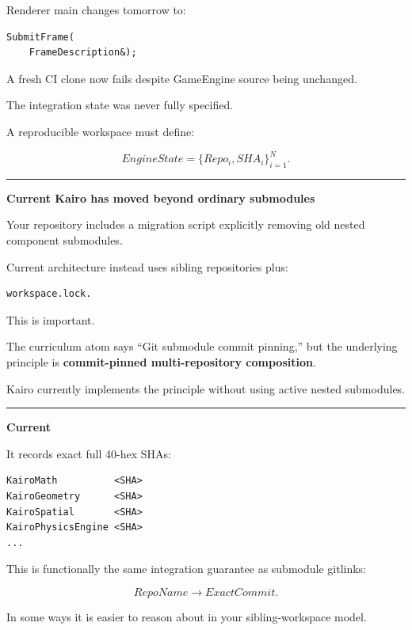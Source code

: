 Renderer main changes tomorrow to:

\begin{verbatim}
SubmitFrame(
    FrameDescription&);
\end{verbatim}

A fresh CI clone now fails despite GameEngine source being unchanged.

The integration state was never fully specified.

A reproducible workspace must define:

\[
\boxed{
EngineState=
\{Repo_i,SHA_i\}_{i=1}^{N}.
}
\]

\begin{center}\rule{0.5\linewidth}{0.5pt}\end{center}

\textbf{Current Kairo has moved beyond ordinary submodules}

Your repository includes a migration script explicitly removing old nested component submodules.

Current architecture instead uses sibling repositories plus:

\begin{verbatim}
workspace.lock.
\end{verbatim}

This is important.

The curriculum atom says ``Git submodule commit pinning,'' but the underlying principle is \textbf{commit-pinned multi-repository composition}.

Kairo currently implements the principle without using active nested submodules.

\begin{center}\rule{0.5\linewidth}{0.5pt}\end{center}

\textbf{Current }

It records exact full 40-hex SHAs:

\begin{verbatim}
KairoMath          <SHA>
KairoGeometry      <SHA>
KairoSpatial       <SHA>
KairoPhysicsEngine <SHA>
...
\end{verbatim}

This is functionally the same integration guarantee as submodule gitlinks:

\[
RepoName
\rightarrow
ExactCommit.
\]

In some ways it is easier to reason about in your sibling-workspace model.

